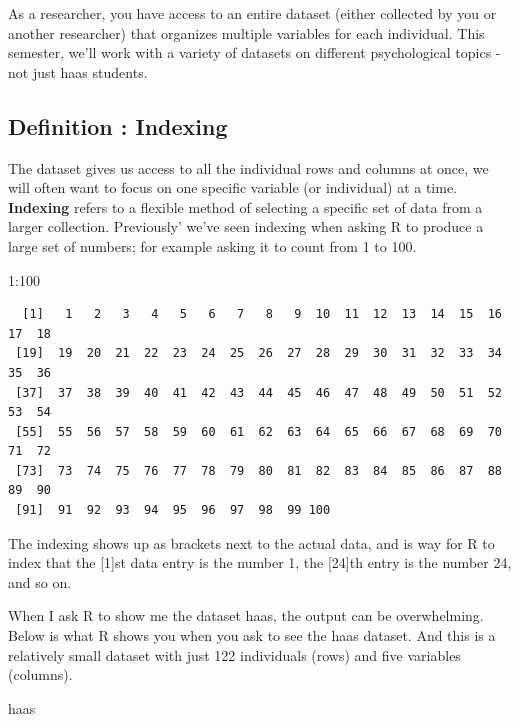 \documentclass[
  letterpaper,
  DIV=11,
  numbers=noendperiod,
  oneside]{scrreprt}
\newenvironment{Shaded}{\begin{snugshade}}{\end{snugshade}}
\newcommand{\DecValTok}[1]{\textcolor[rgb]{0.68,0.00,0.00}{#1}}
\newcommand{\NormalTok}[1]{\textcolor[rgb]{0.00,0.23,0.31}{#1}}
\newcommand{\SpecialCharTok}[1]{\textcolor[rgb]{0.37,0.37,0.37}{#1}}
\begin{document}
As a researcher, you have access to an entire dataset (either collected
by you or another researcher) that organizes multiple variables for each
individual. This semester, we'll work with a variety of datasets on
different psychological topics - not just haas students.

\subsection{Definition : Indexing}\label{definition-indexing}

The dataset gives us access to all the individual rows and columns at
once, we will often want to focus on one specific variable (or
individual) at a time. \textbf{Indexing} refers to a flexible method of
selecting a specific set of data from a larger collection. Previously'
we've seen indexing when asking R to produce a large set of numbers; for
example asking it to count from 1 to 100.

\begin{Shaded}
\begin{Highlighting}[]
\DecValTok{1}\SpecialCharTok{:}\DecValTok{100}
\end{Highlighting}
\end{Shaded}

\begin{verbatim}
  [1]   1   2   3   4   5   6   7   8   9  10  11  12  13  14  15  16  17  18
 [19]  19  20  21  22  23  24  25  26  27  28  29  30  31  32  33  34  35  36
 [37]  37  38  39  40  41  42  43  44  45  46  47  48  49  50  51  52  53  54
 [55]  55  56  57  58  59  60  61  62  63  64  65  66  67  68  69  70  71  72
 [73]  73  74  75  76  77  78  79  80  81  82  83  84  85  86  87  88  89  90
 [91]  91  92  93  94  95  96  97  98  99 100
\end{verbatim}

The indexing shows up as brackets next to the actual data, and is way
for R to index that the {[}1{]}st data entry is the number 1, the
{[}24{]}th entry is the number 24, and so on.

When I ask R to show me the dataset haas, the output can be
overwhelming. Below is what R shows you when you ask to see the haas
dataset. And this is a relatively small dataset with just 122
individuals (rows) and five variables (columns).

\begin{Shaded}
\begin{Highlighting}[]
\NormalTok{haas}
\end{Highlighting}
\end{Shaded}
\end{document}
